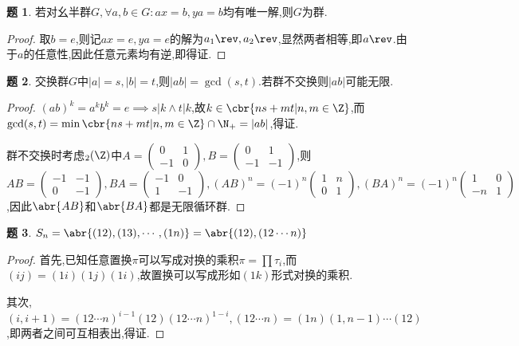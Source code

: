 \documentclass{article}
\newcommand{\matrixtwo}[4]{\begin{pmatrix}#1&#2\\#3&#4 \end{pmatrix}}
\theoremstyle{definition}
\newtheorem{exercise}{题}[section]
\begin{document}
\begin{exercise}
    若对幺半群$G, \forall a,b\in G: ax=b, ya=b$均有唯一解,则$G$为群.
\end{exercise}
\begin{proof}
    取$b=e$,则记$ax=e, ya=e$的解为$a_1\rev, a_2\rev$,显然两者相等,即$a\rev$.由于$a$的任意性,因此任意元素均有逆,即得证.
\end{proof}

\begin{exercise}
    交换群$G$中$|a|=s,|b|=t$,则$|ab|=\gcd(s,t)$.若群不交换则$|ab|$可能无限.
\end{exercise}
\begin{proof}
    $(ab)^k=a^kb^k=e\implies s|k\land t|k$,故$k\in \cbr{ns+mt|n,m\in \Z}$,而$\gcd(s,t)=\min \cbr{ns+mt|n,m\in \Z}\cap \N_+=|ab|$,得证.

    群不交换时考虑$\sl_2(\Z)$中$A=\matrixtwo{0}{1}{-1}{0}, B=\matrixtwo{0}{1}{-1}{-1}$,则$AB=\matrixtwo{-1}{-1}{0}{-1}, BA=\matrixtwo{-1}{0}{1}{-1}, (AB)^n=(-1)^n\matrixtwo{1}{n}{0}{1}, (BA)^n=(-1)^n\matrixtwo{1}{0}{-n}{1}$,因此$\abr{AB}$和$\abr{BA}$都是无限循环群.
\end{proof}

\begin{exercise}
    $S_n=\abr{(12),(13),\cdots,(1n)}=\abr{(12),(12\cdots n)}$
\end{exercise}
\begin{proof}
    首先,已知任意置换$\pi$可以写成对换的乘积$\pi=\prod \tau_i$,而$(ij)=(1i)(1j)(1i)$,故置换可以写成形如$(1k)$形式对换的乘积.

    其次,$(i,i+1)=(12\cdots n)^{i-1}(12)(12\cdots n)^{1-i}, (12\cdots n)=(1n)(1,n-1)\cdots (12)$,即两者之间可互相表出,得证.
\end{proof}
\end{document}
